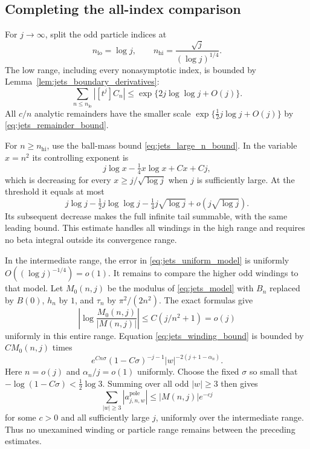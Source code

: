 \documentclass[11pt]{article}
\numberwithin{equation}{section}
\theoremstyle{definition}
\begin{document}
\subsection{Completing the all-index comparison}

For $j\to\infty$, split the odd particle indices at
\[
 n_{\mathrm{lo}}=\log j,\qquad
 n_{\mathrm{hi}}=\frac{\sqrt j}{(\log j)^{1/4}}.
\]
The low range, including every nonasymptotic index, is bounded by
Lemma~\ref{lem:jets_boundary_derivatives}:
\begin{equation}\label{eq:jets_low_range}
 \sum_{n\le n_{\mathrm{lo}}}|[t^j]C_n|
 \le\exp\{2j\log\log j+O(j)\}.
\end{equation}
All $c/n$ analytic remainders have the smaller scale
$\exp\{\tfrac12j\log j+O(j)\}$ by
\eqref{eq:jets_remainder_bound}.

For $n\ge n_{\mathrm{hi}}$, use the ball-mass bound
\eqref{eq:jets_large_n_bound}. In the variable $x=n^2$ its
controlling exponent is
\[
 j\log x-\tfrac14x\log x+Cx+Cj,
\]
which is decreasing for every $x\ge j/\sqrt{\log j}$ when $j$
is sufficiently large. At the threshold it equals at most
\begin{equation}\label{eq:jets_high_range}
 j\log j-\tfrac12j\log\log j-\tfrac14j\sqrt{\log j}
       +o(j\sqrt{\log j}).
\end{equation}
Its subsequent decrease makes the full infinite tail summable,
with the same leading bound. This estimate handles all windings in
the high range and requires no beta integral outside its
convergence range.

In the intermediate range, the error in
\eqref{eq:jets_uniform_model} is uniformly
$O((\log j)^{-1/4})=o(1)$. It remains to compare the higher odd
windings to that model. Let $M_0(n,j)$ be the modulus of
\eqref{eq:jets_model} with $B_n$ replaced by $B(0)$, $h_n$ by
$1$, and $\tau_n$ by $\pi^2/(2n^2)$. The exact formulas give
\begin{equation}\label{eq:jets_baseline_ratio}
 \left|\log\frac{M_0(n,j)}{|M(n,j)|}\right|
 \le C(j/n^2+1)=o(j)
\end{equation}
uniformly in this entire range. Equation
\eqref{eq:jets_winding_bound} is bounded by $CM_0(n,j)$ times
\[
 e^{Cn\sigma}(1-C\sigma)^{-j-1}
 |w|^{-2(j+1-\alpha_n)}.
\]
Here $n=o(j)$ and $\alpha_n/j=o(1)$ uniformly. Choose the fixed
$\sigma$ so small that $-\log(1-C\sigma)<\tfrac12\log3$.
Summing over all odd $|w|\ge3$ then gives
\begin{equation}\label{eq:jets_higher_windings_negligible}
 \sum_{|w|\ge3}|a_{j,n,w}^{\mathrm{pole}}|
 \le |M(n,j)|e^{-c j}
\end{equation}
for some $c>0$ and all sufficiently large $j$, uniformly over the
intermediate range. Thus no unexamined winding or particle range
remains between the preceding estimates.
\end{document}
